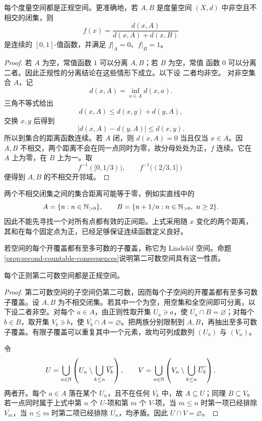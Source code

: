 \begin{theorem}[度量空间的函数分离]
\label{thm:metric-spaces-normal}
每个度量空间都是正规空间。更准确地，若 \(A,B\) 是度量空间
\((X,d)\) 中非空且不相交的闭集，则
\[
 f(x)=\frac{d(x,A)}{d(x,A)+d(x,B)}
\]
是连续的 \([0,1]\)-值函数，并满足 \(f|_A=0\)、\(f|_B=1\)。
\end{theorem}

\begin{proof}
若 \(A\) 为空，常值函数 \(1\) 可以分离 \(A,B\)；若 \(B\) 为空，常值
函数 \(0\) 可以分离二者。因此正规性的分离结论在这些情形下成立。以下设
二者均非空。
对非空集合 \(A\)，记
\[
 d(x,A)=\inf_{a\in A}d(x,a).
\]
三角不等式给出
\[
 d(x,A)\le d(x,y)+d(y,A),
\]
交换 \(x,y\) 后得到
\[
 |d(x,A)-d(y,A)|\le d(x,y).
\]
所以到集合的距离函数连续。若 \(A\) 闭，则
\(d(x,A)=0\) 当且仅当 \(x\in A\)。因 \(A,B\) 不相交，两个距离不会在同一点同时为零，故分母处处为正，\(f\) 连续。它在 \(A\) 上为零，在 \(B\) 上为一。取
\[
 f^{-1}([0,1/3)),\qquad f^{-1}((2/3,1])
\]
便得到 \(A,B\) 的不相交开邻域。
\end{proof}

两个不相交闭集之间的集合距离可能等于零，例如实直线中的
\[
 A=\{n:n\in\mathbb{N}_{>0}\},\qquad
 B=\{n+1/n:n\in\mathbb{N}_{>0},\ n\ge2\}.
\]
因此不能先寻找一个对所有点都有效的正间距。上式采用随 \(x\) 变化的两个距离，其和在每个固定点为正，已经足够保证连续函数定义良好。

若空间的每个开覆盖都有至多可数的子覆盖，称它为 Lindelöf 空间。命题
\ref{prop:second-countable-consequences}说明第二可数空间具有这一性质。

\begin{theorem}[正则第二可数空间正规]
\label{thm:regular-second-countable-normal}
每个正则第二可数空间都是正规空间。
\end{theorem}

\begin{proof}
第二可数空间的子空间仍第二可数，因而每个子空间的开覆盖都有至多可数子覆盖。设 \(A,B\) 为不相交闭集。若其中一个为空，用空集和全空间即可分离，以下设二者非空。对每个 \(a\in A\)，由正则性取开集 \(U_a\ni a\)，使 \(\overline{U_a}\cap B=\varnothing\)；对每个 \(b\in B\)，取开集 \(V_b\ni b\)，使 \(\overline{V_b}\cap A=\varnothing\)。把两族分别限制到 \(A,B\)，再抽出至多可数子覆盖。有限子覆盖可以重复其中一个元素，故均可列成数列 \((U_n)\) 与 \((V_n)\)。

令
\[
 U=\bigcup_{n\in\mathbb{N}}\left(U_n\setminus\bigcup_{k\le n}\overline{V_k}\right),
 \qquad
 V=\bigcup_{n\in\mathbb{N}}\left(V_n\setminus\bigcup_{k\le n}\overline{U_k}\right).
\]
两者开。每个 \(a\in A\) 落在某个 \(U_n\)，且不在任何 \(\overline{V_k}\) 中，故 \(A\subseteq U\)；同理 \(B\subseteq V\)。若一点同时属于上式中第 \(n\) 个 \(U\)-项和第 \(m\) 个 \(V\)-项，当 \(m\le n\) 时第一项已经排除 \(\overline{V_m}\)，当 \(n\le m\) 时第二项已经排除 \(\overline{U_n}\)，均矛盾。因此 \(U\cap V=\varnothing\)。
\end{proof}

